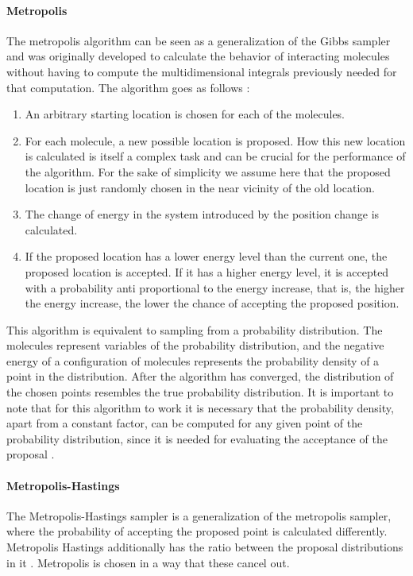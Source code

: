 \documentclass{article}
\begin{document}
\paragraph{Metropolis}
The metropolis algorithm can be seen as a generalization of the Gibbs sampler \cite{1439840954} and was originally developed to calculate the behavior of interacting molecules without having to compute the multidimensional integrals previously needed for that computation\cite{Metropolis1953}. The algorithm goes as follows : 
\begin{enumerate}
	\item An arbitrary starting location is chosen for each of the molecules. 
	\item For each molecule, a new possible location is proposed. How this new location is calculated is itself a complex task and can be crucial for the performance of the algorithm. For the sake of simplicity we assume here that the proposed location is just randomly chosen in the near vicinity of the old location.
	\item The change of energy in the system introduced by the position change is calculated.
	\item If the proposed location has a lower energy level than the current one, the proposed location is accepted. If it has a higher energy level, it is accepted with
	a probability anti proportional to the energy increase, that is, the higher the energy increase, the lower the chance of accepting the proposed position. 
\end{enumerate}
This algorithm is equivalent to sampling from a probability distribution. The molecules represent variables of the probability distribution, and the negative energy of a configuration of molecules represents the probability density of a point in the distribution. After the algorithm has converged, the distribution of the chosen points resembles the true probability distribution. It is important to note that for this algorithm to work it is necessary that the probability density, apart from a constant factor, can be computed for any given point of the probability distribution, since it is needed for evaluating the acceptance of the proposal \cite{1439840954}.

\paragraph{Metropolis-Hastings}
The Metropolis-Hastings sampler is a generalization of the metropolis sampler, where the probability of accepting the proposed point is calculated differently.
Metropolis Hastings additionally has the ratio between the proposal distributions in it \cite{chib1995understanding}. Metropolis is chosen in a way that these cancel out.
\end{document}
